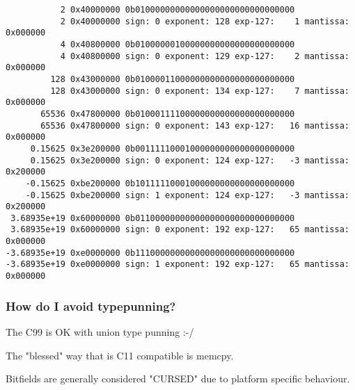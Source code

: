 \documentclass[11pt]{article}
\begin{document}
\begin{verbatim}
           2 0x40000000 0b01000000000000000000000000000000
           2 0x40000000 sign: 0 exponent: 128 exp-127:    1 mantissa: 0x000000
           4 0x40800000 0b01000000100000000000000000000000
           4 0x40800000 sign: 0 exponent: 129 exp-127:    2 mantissa: 0x000000
         128 0x43000000 0b01000011000000000000000000000000
         128 0x43000000 sign: 0 exponent: 134 exp-127:    7 mantissa: 0x000000
       65536 0x47800000 0b01000111100000000000000000000000
       65536 0x47800000 sign: 0 exponent: 143 exp-127:   16 mantissa: 0x000000
     0.15625 0x3e200000 0b00111110001000000000000000000000
     0.15625 0x3e200000 sign: 0 exponent: 124 exp-127:   -3 mantissa: 0x200000
    -0.15625 0xbe200000 0b10111110001000000000000000000000
    -0.15625 0xbe200000 sign: 1 exponent: 124 exp-127:   -3 mantissa: 0x200000
 3.68935e+19 0x60000000 0b01100000000000000000000000000000
 3.68935e+19 0x60000000 sign: 0 exponent: 192 exp-127:   65 mantissa: 0x000000
-3.68935e+19 0xe0000000 0b11100000000000000000000000000000
-3.68935e+19 0xe0000000 sign: 1 exponent: 192 exp-127:   65 mantissa: 0x000000
\end{verbatim}

\subsubsection{How do I avoid typepunning?}
\label{sec:org4b39066}

The C99 is OK with union type punning :-/

The "blessed" way that is C11 compatible is memcpy.

Bitfields are generally considered "CURSED" due to platform specific
behaviour.
\end{document}
